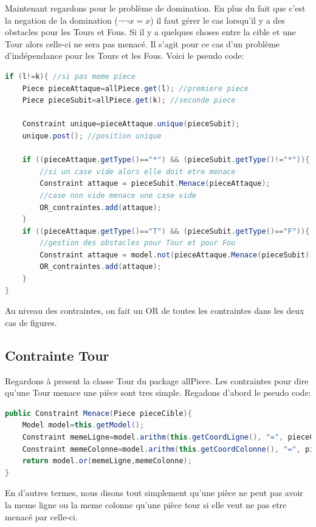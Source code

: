 \documentclass[a4paper,10pt]{article}
\begin{document}
\par Maintenant regardons pour le problème de domination. En plus du fait que c'est la negation de la domination ($\neg \neg x=x$) il faut gérer le cas lorsqu'il y a des obstacles pour les Tours et Fous. Si il y a quelques choses entre la cible et une Tour alors celle-ci ne sera pas menacé. Il s'agit pour ce cas d'un problème d'indépendance pour les Tours et les Fous. Voici le pseudo code:
\begin{lstlisting}[language=Java,basicstyle=\tiny]
if (l!=k){ //si pas meme piece
	Piece pieceAttaque=allPiece.get(l); //premiere piece
	Piece pieceSubit=allPiece.get(k); //seconde piece
		
	Constraint unique=pieceAttaque.unique(pieceSubit);
	unique.post(); //position unique
			
	if ((pieceAttaque.getType()=="*") && (pieceSubit.getType()!="*")){
		//si un case vide alors elle doit etre menace
		Constraint attaque = pieceSubit.Menace(pieceAttaque); 
		//case non vide menace une case vide
		OR_contraintes.add(attaque);
	}
	if ((pieceAttaque.getType()=="T") && (pieceSubit.getType()=="F")){
		//gestion des obstacles pour Tour et pour Fou
		Constraint attaque = model.not(pieceAttaque.Menace(pieceSubit));
		OR_contraintes.add(attaque);
	}
}
\end{lstlisting}

\par Au niveau des contraintes, on fait un OR de toutes les contraintes dans les deux cas de figures.

\subsection{Contrainte Tour}
\par Regardons à present la classe Tour du package allPiece. Les contraintes pour dire qu'une Tour menace une pièce sont tres simple. Regadons d'abord le pseudo code:

\begin{lstlisting}[language=Java,basicstyle=\tiny]
public Constraint Menace(Piece pieceCible){
	Model model=this.getModel();
	Constraint memeLigne=model.arithm(this.getCoordLigne(), "=", pieceCible.getCoordLigne());
	Constraint memeColonne=model.arithm(this.getCoordColonne(), "=", pieceCible.getCoordColonne());
	return model.or(memeLigne,memeColonne);
}
\end{lstlisting}
 En d'autres termes, nous disons tout simplement qu'une pièce ne peut pas avoir la meme ligne ou la meme colonne qu'une pièce tour si elle veut ne pas etre menacé par celle-ci.
\end{document}
